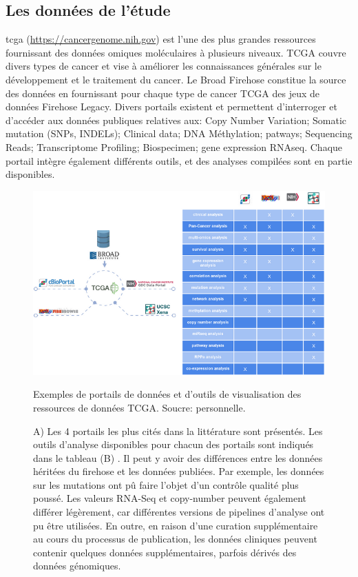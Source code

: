\documentclass{style}
\begin{document}
\subsection{Les données de l’étude}
\acrfull{tcga} (\hyperlink{https://cancergenome.nih.gov}{https://cancergenome.nih.gov}) est l'une des plus grandes ressources fournissant des données omiques moléculaires à plusieurs niveaux. TCGA couvre divers types de cancer et vise à améliorer les connaissances générales sur le développement et le traitement du cancer. Le Broad Firehose constitue la source des données en fournissant pour chaque type de cancer TCGA des jeux de données Firehose Legacy. 
Divers portails existent et permettent d'interroger et d’accéder aux données publiques relatives aux: Copy Number Variation; Somatic mutation (SNPs, INDELs); Clinical data; DNA Méthylation; patways; Sequencing Reads; Transcriptome Profiling; Biospecimen; gene expression RNAseq.  Chaque portail intègre également différents outils, et des analyses compilées sont en partie disponibles. 
\begin{figure}[H]
  \centering
  \includegraphics[width=16cm]{images/figures/cBioPortail.png}
  \caption[Exemples de portails et d'outils de visualisation des ressources de données TCGA.]{Exemples de portails de données et d'outils de visualisation des ressources de données TCGA. Soucre: personnelle.}
  \caption*{A) Les 4 portails les plus cités dans la littérature sont présentés. Les outils d'analyse disponibles pour chacun des portails sont indiqués dans le tableau (B) . Il peut y avoir des différences entre les données héritées du firehose et les données publiées. Par exemple, les données sur les mutations ont pû faire l'objet d'un contrôle qualité plus poussé. Les valeurs RNA-Seq et copy-number peuvent également différer légèrement, car différentes versions de pipelines d'analyse ont pu être utilisées. En outre, en raison d'une curation supplémentaire au cours du processus de publication, les données cliniques peuvent contenir quelques données supplémentaires, parfois dérivés des données génomiques.}
  \label{cBioPortail}
\end{figure}
\end{document}
